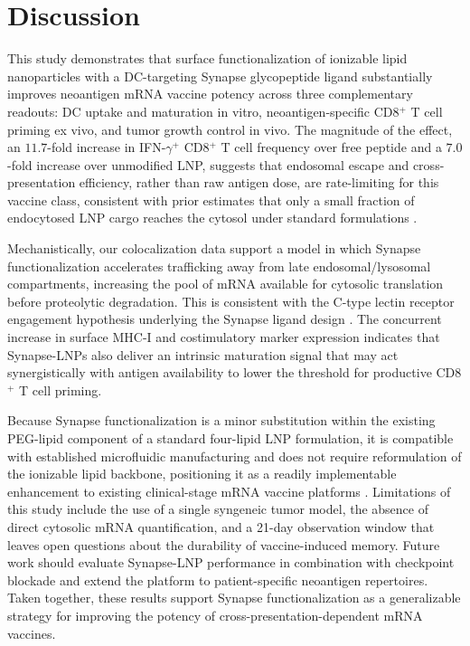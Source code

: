 \section{Discussion}

This study demonstrates that surface functionalization of ionizable lipid nanoparticles with a DC-targeting Synapse glycopeptide ligand substantially improves neoantigen mRNA vaccine potency across three complementary readouts: DC uptake and maturation in vitro, neoantigen-specific CD8$^{+}$ T cell priming ex vivo, and tumor growth control in vivo. The magnitude of the effect, an $11.7$-fold increase in IFN-$\gamma^{+}$ CD8$^{+}$ T cell frequency over free peptide and a $7.0$-fold increase over unmodified LNP, suggests that endosomal escape and cross-presentation efficiency, rather than raw antigen dose, are rate-limiting for this vaccine class, consistent with prior estimates that only a small fraction of endocytosed LNP cargo reaches the cytosol under standard formulations \citep{Nimbus2023}.

Mechanistically, our colocalization data support a model in which Synapse functionalization accelerates trafficking away from late endosomal/lysosomal compartments, increasing the pool of mRNA available for cytosolic translation before proteolytic degradation. This is consistent with the C-type lectin receptor engagement hypothesis underlying the Synapse ligand design \citep{Lindgren2022,Vertex2021}. The concurrent increase in surface MHC-I and costimulatory marker expression indicates that Synapse-LNPs also deliver an intrinsic maturation signal that may act synergistically with antigen availability to lower the threshold for productive CD8$^{+}$ T cell priming.

Because Synapse functionalization is a minor substitution within the existing PEG-lipid component of a standard four-lipid LNP formulation, it is compatible with established microfluidic manufacturing and does not require reformulation of the ionizable lipid backbone, positioning it as a readily implementable enhancement to existing clinical-stage mRNA vaccine platforms \citep{Anand2025,Meridian2024}. Limitations of this study include the use of a single syngeneic tumor model, the absence of direct cytosolic mRNA quantification, and a 21-day observation window that leaves open questions about the durability of vaccine-induced memory. Future work should evaluate Synapse-LNP performance in combination with checkpoint blockade and extend the platform to patient-specific neoantigen repertoires. Taken together, these results support Synapse functionalization as a generalizable strategy for improving the potency of cross-presentation-dependent mRNA vaccines.
